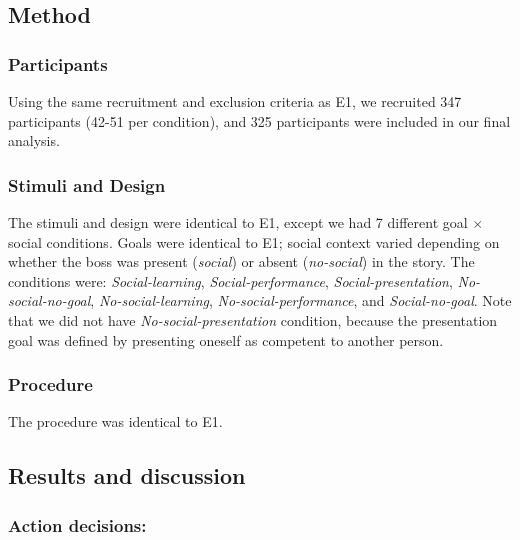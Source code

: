 \documentclass[10pt, letterpaper]{article}
\begin{document}
\subsection{Method}\label{method-1}

\subsubsection{Participants}\label{participants-1}

Using the same recruitment and exclusion criteria as E1, we recruited
347 participants (42-51 per condition), and 325 participants were
included in our final analysis.

\subsubsection{Stimuli and Design}\label{stimuli-and-design-1}

The stimuli and design were identical to E1, except we had 7 different
goal \(\times\) social conditions. Goals were identical to E1; social
context varied depending on whether the boss was present (\emph{social})
or absent (\emph{no-social}) in the story. The conditions were:
\emph{Social-learning}, \emph{Social-performance},
\emph{Social-presentation}, \emph{No-social-no-goal},
\emph{No-social-learning}, \emph{No-social-performance}, and
\emph{Social-no-goal}. Note that we did not have
\emph{No-social-presentation} condition, because the presentation goal
was defined by presenting oneself as competent to another person.

\subsubsection{Procedure}\label{procedure-1}

The procedure was identical to E1.

\subsection{Results and discussion}\label{results-and-discussion-1}

\subsubsection{Action decisions:}\label{action-decisions-1}
\end{document}
